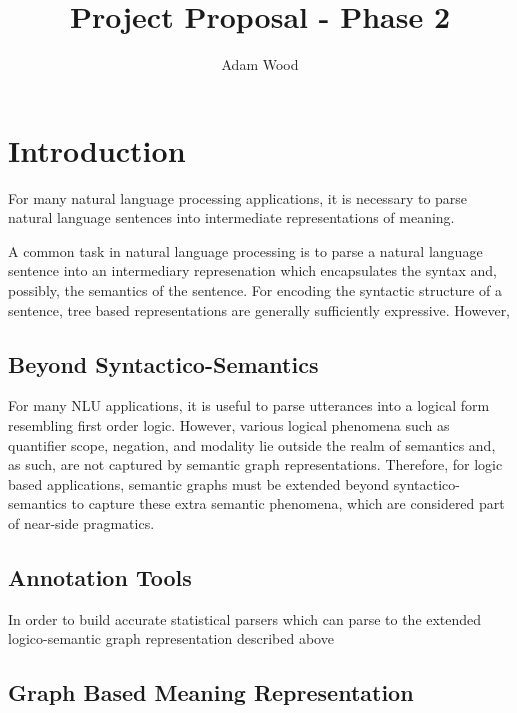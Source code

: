 \documentclass{article}
\title{Project Proposal - Phase 2}
\author{Adam Wood}
\begin{document}
\maketitle

\section{Introduction}

For many natural language processing applications, it is necessary to parse natural language sentences into intermediate representations of meaning. 

A common task in natural language processing is to parse a natural language sentence into an intermediary represenation which encapsulates the syntax and, possibly, the semantics of the sentence. For encoding the syntactic structure of a sentence, tree based representations are generally sufficiently expressive. However, 

\subsection{Beyond Syntactico-Semantics}

For many NLU applications, it is useful to parse utterances into a logical form resembling first order logic. However, various logical phenomena such as quantifier scope, negation, and modality lie outside the realm of semantics and, as such, are not captured by semantic graph representations. Therefore, for logic based applications, semantic graphs must be extended beyond syntactico-semantics to capture these extra semantic phenomena, which are considered part of near-side pragmatics.

\subsection{Annotation Tools}

In order to build accurate statistical parsers which can parse to the extended logico-semantic graph representation described above

\subsection{Graph Based Meaning Representation}
\end{document}
